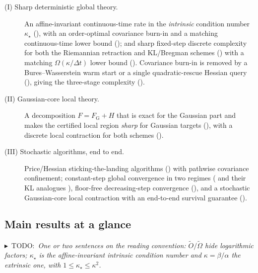 \documentclass[11pt]{article}
\theoremstyle{plain}
\theoremstyle{definition}
\theoremstyle{remark}
\newcommand{\FGauss}{F_{\mathrm G}}
\newcommand{\TODO}[1]{{\color{red}$\blacktriangleright$~\textsf{TODO:}~\textit{#1}}}
\newcommand{\kappastar}{\kappa_\star}
\begin{document}
\begin{description}
\item[\textnormal{(I) Sharp deterministic global theory.}]
An affine-invariant continuous-time rate in the \emph{intrinsic} condition number $\kappastar$
(), with an order-optimal covariance burn-in and a matching continuous-time
lower bound (); and sharp fixed-step discrete complexity for both
the Riemannian retraction and KL/Bregman schemes () with a matching
$\Omega(\kappa/\Delta t)$ lower bound (). Covariance
burn-in is removed by a Bures--Wasserstein warm start or a single quadratic-rescue Hessian query
(), giving the three-stage complexity
().
\item[\textnormal{(II) Gaussian-core local theory.}]
A decomposition $F=\FGauss+H$ that is exact for the Gaussian part and makes the certified local region
\emph{sharp} for Gaussian targets (), with a discrete local
contraction for both schemes ().
\item[\textnormal{(III) Stochastic algorithms, end to end.}]
Price/Hessian sticking-the-landing algorithms () with pathwise covariance
confinement; constant-step global convergence in two regimes (
and their KL analogues ), floor-free decreasing-step convergence
(), and a stochastic Gaussian-core local contraction with an end-to-end survival
guarantee ().
\end{description}

\subsection{Main results at a glance}
\label{sec:intro-tables}
\TODO{One or two sentences on the reading convention: $\widetilde O/\widetilde\Omega$ hide logarithmic
factors; $\kappastar$ is the affine-invariant intrinsic condition number and $\kappa=\beta/\alpha$ the
extrinsic one, with $1\le\kappastar\le\kappa^2$.}
\end{document}
